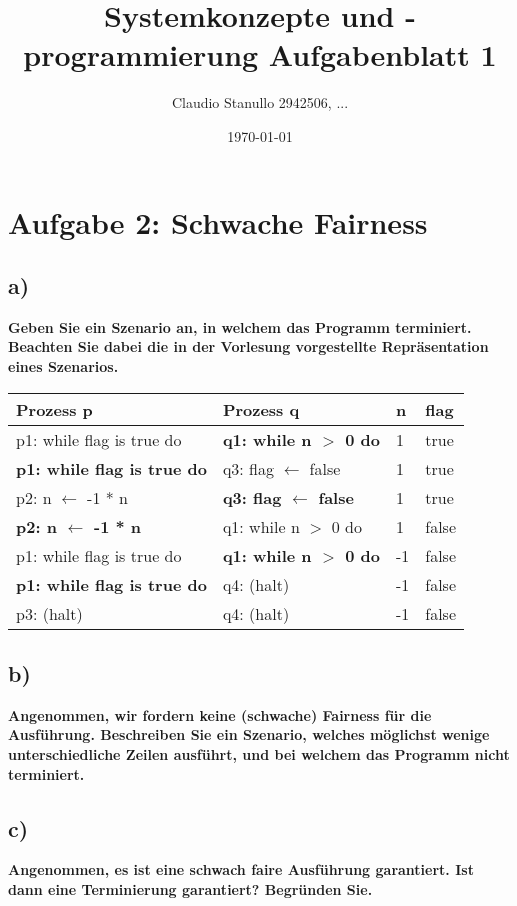 \documentclass[12pt,pdftex,a4paper]{article}
\title{Systemkonzepte und -programmierung  Aufgabenblatt 1}
\author{Claudio Stanullo 2942506, ...}
\date{\today}
\begin{document}
\maketitle
\section*{Aufgabe 2: Schwache Fairness}
\subsection*{a)}
\textbf{Geben Sie ein Szenario an, in welchem das Programm terminiert. Beachten
Sie dabei die in der Vorlesung vorgestellte Repräsentation eines Szenarios.}\newline
\begin{tabular}[c]{|l|l|l|l|}
\hline
Prozess p&Prozess q&n&flag\\
\hline
p1: while flag is true do&\textbf{q1: while n $>$ 0 do}&1&true\\
\textbf{p1: while flag is true do} &q3: flag $\leftarrow$ false&1&true\\
p2: n $\leftarrow$ -1 * n &\textbf{q3: flag $\leftarrow$ false}&1&true\\
\textbf{p2: n $\leftarrow$ -1 * n}&q1: while n $>$ 0 do&1&false\\
p1: while flag is true do&\textbf{q1: while n $>$ 0 do}&-1&false\\
\textbf{p1: while flag is true do}&q4: (halt)&-1&false\\
p3: (halt)&q4: (halt)&-1&false\\
\hline
\end{tabular}
\subsection*{b)}
\textbf{Angenommen, wir fordern keine (schwache) Fairness für die Ausführung.
Beschreiben Sie ein Szenario, welches möglichst wenige unterschiedliche Zeilen ausführt,
und bei welchem das Programm nicht terminiert.
}\newline
\subsection*{c)}
\textbf{ Angenommen, es ist eine schwach faire Ausführung garantiert. Ist dann
eine Terminierung garantiert? Begründen Sie.}\newline
\end{document}
